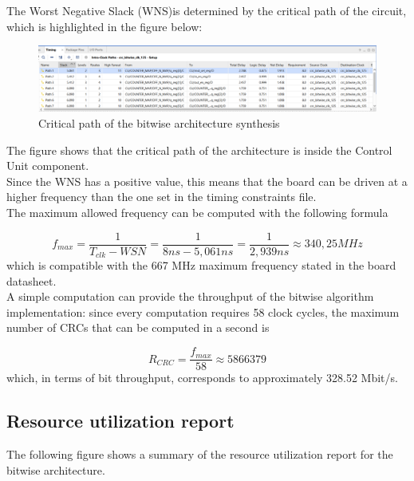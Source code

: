 The Worst Negative Slack (WNS)is determined by the critical path of the circuit, which is highlighted in the figure below:

\begin{figure}[H]
    \begin{center}
        \includegraphics[scale=.5,clip]{img/vivado_bit_critical_path.png}
    \end{center}
    \vspace*{-0.5cm}
    \caption{Critical path of the bitwise architecture synthesis}
    \label{fig:vivado_bit_critical_path}
\end{figure}
\hfill \break
The figure shows that the critical path of the architecture is inside the Control Unit component.\\
Since the WNS has a positive value, this means that the board can be driven at a higher frequency than the one set in the timing constraints file.\\
The maximum allowed frequency can be computed with the following formula

\begin{equation}\label{eq:max_freq}
f_{max} = \frac{1}{T_{clk} - WSN} = \frac{1}{8 ns - 5,061 ns} = \frac{1}{2,939 ns} \approx 340,25 MHz
\end{equation}
\hfill \break
which is compatible with the 667 MHz maximum frequency stated in the board datasheet.\\
A simple computation can provide the throughput of the bitwise algorithm implementation: since every computation requires 58 clock cycles, the maximum number of CRCs that can be computed in a second is

\begin{equation}\label{eq:CRC_per_second}
R_{CRC} = \frac{f_{max}}{58} \approx 5866379
\end{equation}
\hfill \break
which, in terms of bit throughput, corresponds to approximately 328.52 Mbit/s.

\subsection{Resource utilization report}

The following figure shows a summary of the resource utilization report for the bitwise architecture.

